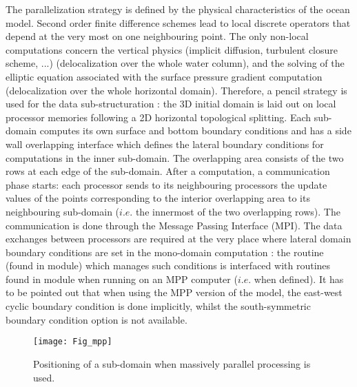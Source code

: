 \documentclass[../tex_main/NEMO_manual]{subfiles}
\begin{document}
The parallelization strategy is defined by the physical characteristics of the 
ocean model. Second order finite difference schemes lead to local discrete 
operators that depend at the very most on one neighbouring point. The only 
non-local computations concern the vertical physics (implicit diffusion, 
turbulent closure scheme, ...) (delocalization over the whole water column), 
and the solving of the elliptic equation associated with the surface pressure 
gradient computation (delocalization over the whole horizontal domain). 
Therefore, a pencil strategy is used for the data sub-structuration 
: the 3D initial domain is laid out on local processor 
memories following a 2D horizontal topological splitting. Each sub-domain 
computes its own surface and bottom boundary conditions and has a side 
wall overlapping interface which defines the lateral boundary conditions for 
computations in the inner sub-domain. The overlapping area consists of the 
two rows at each edge of the sub-domain. After a computation, a communication 
phase starts: each processor sends to its neighbouring processors the update 
values of the points corresponding to the interior overlapping area to its 
neighbouring sub-domain ($i.e.$ the innermost of the two overlapping rows). 
The communication is done through the Message Passing Interface (MPI). 
The data exchanges between processors are required at the very 
place where lateral domain boundary conditions are set in the mono-domain 
computation : the  routine (found in  module) 
which manages such conditions is interfaced with routines found in  module 
when running on an MPP computer ($i.e.$ when  defined). 
It has to be pointed out that when using the MPP version of the model, 
the east-west cyclic boundary condition is done implicitly, 
whilst the south-symmetric boundary condition option is not available.

\begin{figure}[!t]    \begin{center}
\texttt{[image: Fig\_mpp]}
\caption{   \protect\label{fig:mpp} 
Positioning of a sub-domain when massively parallel processing is used. }
\end{center}   \end{figure}
\end{document}
